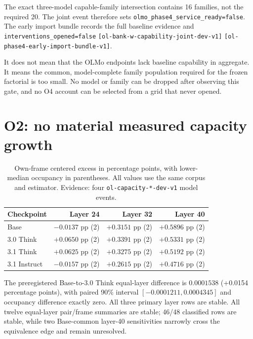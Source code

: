 \documentclass[11pt]{article}
\newcommand{\eid}[1]{{\footnotesize\nolinkurl{[#1]}}}
\begin{document}
The exact three-model capable-family intersection contains 16 families, not
the required 20. The joint event therefore sets
\texttt{olmo\_phase4\_service\_ready=false}. The early import bundle records
the full baseline evidence and \texttt{interventions\_opened=false}
\eid{ol-bank-w-capability-joint-dev-v1}
\eid{ol-phase4-early-import-bundle-v1}.

\begin{warningbox}[title={What 16/20 means}]
It does not mean that the OLMo endpoints lack baseline capability in aggregate.
It means the common, model-complete family population required for the frozen
factorial is too small. No model or family can be dropped after observing this
gate, and no O4 account can be selected from a grid that never opened.
\end{warningbox}

\section{O2: no material measured capacity growth}

\begin{table}[H]
\centering\small
\begin{tabular}{@{}lrrr@{}}
\toprule
\textbf{Checkpoint} & \textbf{Layer 24} & \textbf{Layer 32} & \textbf{Layer 40}\\
\midrule
Base & $-0.0137$ pp (2) & $+0.3151$ pp (2) & $+0.5896$ pp (2)\\
3.0 Think & $+0.0650$ pp (2) & $+0.3391$ pp (2) & $+0.5331$ pp (2)\\
3.1 Think & $+0.0625$ pp (2) & $+0.3275$ pp (2) & $+0.5192$ pp (2)\\
3.1 Instruct & $-0.0157$ pp (2) & $+0.2615$ pp (2) & $+0.4716$ pp (2)\\
\bottomrule
\end{tabular}
\caption{Own-frame centered excess in percentage points, with lower-median
occupancy in parentheses. All values use the same corpus and estimator.
Evidence: four \texttt{ol-capacity-*-dev-v1} model events.}
\end{table}

The preregistered Base-to-3.0 Think equal-layer difference is $0.0001538$
(+0.0154 percentage points), with paired 90\% interval
$[-0.0001211,0.0004345]$ and occupancy difference exactly zero. All three
primary layer rows are stable. All twelve equal-layer pair/frame summaries are
stable; 46/48 classified rows are stable, while two Base-common layer-40
sensitivities narrowly cross the equivalence edge and remain unresolved.
\end{document}
